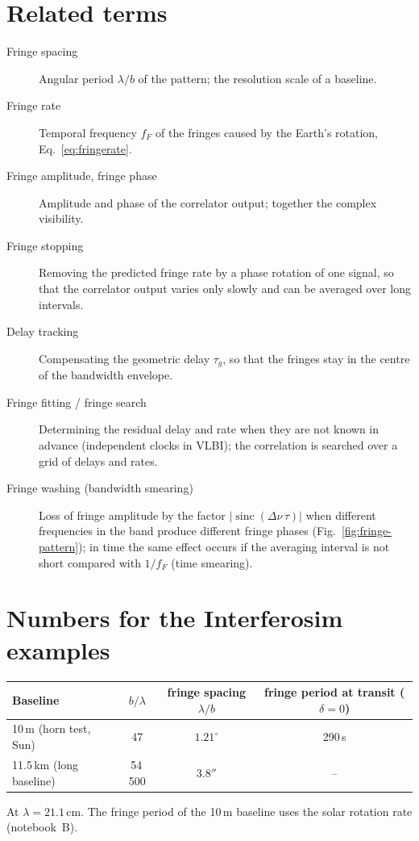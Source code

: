 \section{Related terms}

\begin{description}
  \item[Fringe spacing] Angular period $\lambda/b$ of the pattern; the
        resolution scale of a baseline.
  \item[Fringe rate] Temporal frequency $f_F$ of the fringes caused by
        the Earth's rotation, Eq.~\eqref{eq:fringerate}.
  \item[Fringe amplitude, fringe phase] Amplitude and phase of the
        correlator output; together the complex visibility.
  \item[Fringe stopping] Removing the predicted fringe rate by a phase
        rotation of one signal, so that the correlator output varies
        only slowly and can be averaged over long intervals.
  \item[Delay tracking] Compensating the geometric delay $\tau_g$, so
        that the fringes stay in the centre of the bandwidth envelope.
  \item[Fringe fitting / fringe search] Determining the residual delay
        and rate when they are not known in advance (independent clocks
        in VLBI); the correlation is searched over a grid of delays and
        rates.
  \item[Fringe washing (bandwidth smearing)] Loss of fringe amplitude
        by the factor $|\operatorname{sinc}(\Delta\nu\,\tau)|$ when
        different frequencies in the band produce different fringe
        phases (Fig.~\ref{fig:fringe-pattern}); in time the same effect
        occurs if the averaging interval is not short compared with
        $1/f_F$ (time smearing).
\end{description}

\section{Numbers for the Interferosim examples}

\begin{center}
\begin{tabular}{@{}lccc@{}}
\toprule
Baseline & $b/\lambda$ & fringe spacing $\lambda/b$ & fringe period at transit ($\delta=0$) \\
\midrule
10\,m (horn test, Sun) & 47 & $1.21^\circ$ & 290\,s \\
11.5\,km (long baseline) & 54\,500 & $3.8''$ & -- \\
\bottomrule
\end{tabular}
\end{center}
At $\lambda = 21.1\,\mathrm{cm}$. The fringe period of the 10\,m
baseline uses the solar rotation rate (notebook~B).

